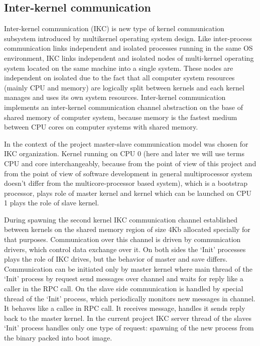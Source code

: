 \documentclass[a4paper,10pt]{article}
\begin{document}
\subsection{Inter-kernel communication}
	Inter-kernel communication (IKC) is new type of kernel communication subsystem introduced by multikernel operating system design.
	Like inter-process communication links independent and isolated processes running in the same OS environment, IKC links independent and isolated nodes of multi-kernel operating system located on the same machine into a single system.
	These nodes are independent on isolated due to the fact that all computer system resources (mainly CPU and memory) are logically split between kernels and each kernel manages and uses its own system resources. 
	Inter-kernel communication implements an inter-kernel communication channel abstraction on the base of shared memory of computer system, because memory is the fastest medium between CPU cores on computer systems with shared memory.
	
	In the context of the project master-slave communication model was chosen for IKC organization. 
	Kernel running on CPU 0 (here and later we will use terms CPU and core interchangeably, because from the point of view of this project and from the point of view of software development in general multiprocessor system doesn't differ from the multicore-processor based system), which is a bootstrap processor, plays role of master kernel and kernel which can be launched on CPU 1 plays the role of slave kernel.
	
	During spawning the second kernel IKC communication channel established between kernels on the shared memory region of size 4Kb allocated specially for that purposes.
	Communication over this channel is driven by communication drivers, which control data exchange over it.
	On both sides the `Init' processes plays the role of IKC drives, but the behavior of master and save differs.
	Communication can be initiated only by master kernel where main thread of the `Init' process by request send messages over channel and waits for reply like a caller in the RPC call.
	On the slave side communication is handled by special thread of the `Init' process, which periodically monitors new messages in channel.
	It behaves like a callee in RPC call. 
	It receives message, handles it sends reply back to the master kernel.
	In the current project IKC server thread of the slaves `Init' process handles only one type of request: spawning of the new process from the binary packed into boot image.
	
\end{document}
